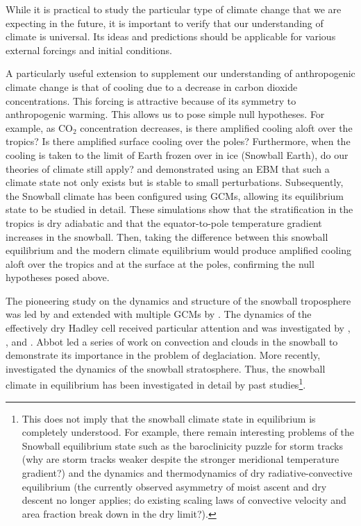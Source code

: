 \documentclass{article}
\begin{document}
While it is practical to study the particular type of climate change that we are expecting in the future, it is important to verify that our understanding of climate is universal. Its ideas and predictions should be applicable for various external forcings and initial conditions.

A particularly useful extension to supplement our understanding of anthropogenic climate change is that of cooling due to a decrease in carbon dioxide concentrations. This forcing is attractive because of its symmetry to anthropogenic warming. This allows us to pose simple null hypotheses. For example, as CO$_2$ concentration decreases, is there amplified cooling aloft over the tropics? Is there amplified surface cooling over the poles? Furthermore, when the cooling is taken to the limit of Earth frozen over in ice (Snowball Earth), do our theories of climate still apply? \citet{budyko-1969} and \citet{sellers-1969} demonstrated using an EBM that such a climate state not only exists but is stable to small perturbations. Subsequently, the Snowball climate has been configured using GCMs, allowing its equilibrium state to be studied in detail. These simulations show that the stratification in the tropics is dry adiabatic and that the equator-to-pole temperature gradient increases in the snowball. Then, taking the difference between this snowball equilibrium and the modern climate equilibrium would produce amplified cooling aloft over the tropics and at the surface at the poles, confirming the null hypotheses posed above.

The pioneering study on the dynamics and structure of the snowball troposphere was led by \citet{pierrehumbert-2005} and extended with multiple GCMs by \citet{abbot-et-al-2013}. The dynamics of the effectively dry Hadley cell received particular attention and was investigated by \citet{caballero-et-al-2008}, \citet{voigt-et-al-2012}, and \citet{voigt-2013}. Abbot led a series of work on convection and clouds in the snowball \citep{abbot-et-al-2012, abbot-2014} to demonstrate its importance in the problem of deglaciation. More recently, \citet{graham-et-al-2019} investigated the dynamics of the snowball stratosphere. Thus, the snowball climate in equilibrium has been investigated in detail by past studies\footnote{This does not imply that the snowball climate state in equilibrium is completely understood. For example, there remain interesting problems of the Snowball equilibrium state such as the baroclinicity puzzle for storm tracks (why are storm tracks weaker despite the stronger meridional temperature gradient?) and the dynamics and thermodynamics of dry radiative-convective equilibrium (the currently observed asymmetry of moist ascent and dry descent no longer applies; do existing scaling laws of convective velocity and area fraction break down in the dry limit?).}.
\end{document}
